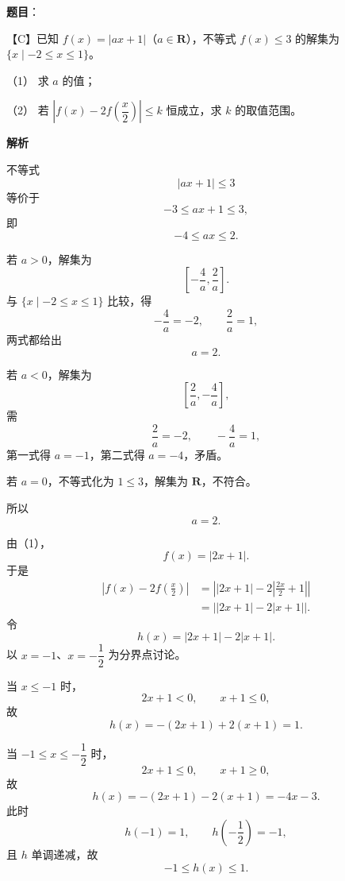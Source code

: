 \begin{answer}

\textbf{题目}：

【C】已知 $f(x)=|ax+1|$（$a\in\mathbf R$），不等式 $f(x)\leqslant 3$ 的解集为 $\{x\mid -2\leqslant x\leqslant 1\}$。

（1） 求 $a$ 的值；

（2） 若 $\left|f(x)-2f\left(\dfrac x2\right)\right|\leqslant k$ 恒成立，求 $k$ 的取值范围。

\textbf{解析}


不等式
\nopagebreak[4]
\[|ax+1|\leqslant3\]
等价于
\nopagebreak[4]
\[-3\leqslant ax+1\leqslant3,\]
即
\nopagebreak[4]
\[-4\leqslant ax\leqslant2.\]

若 $a>0$，解集为
\nopagebreak[4]
\[\left[-\frac4a,\frac2a\right].\]
与 $\{x\mid-2\leqslant x\leqslant1\}$ 比较，得
\nopagebreak[4]
\[-\frac4a=-2,\qquad \frac2a=1,\]
两式都给出
\nopagebreak[4]
\[a=2.\]

若 $a<0$，解集为
\nopagebreak[4]
\[\left[\frac2a,-\frac4a\right],\]
需
\nopagebreak[4]
\[\frac2a=-2,\qquad -\frac4a=1,\]
第一式得 $a=-1$，第二式得 $a=-4$，矛盾。

若 $a=0$，不等式化为 $1\leqslant3$，解集为 $\mathbf R$，不符合。

所以
\nopagebreak[4]
\[a=2.\]


由（1），
\nopagebreak[4]
\[f(x)=|2x+1|.\]
于是
\nopagebreak[4]
\[\begin{aligned}
\left|f(x)-2f\left(\frac x2\right)\right|
&=\left||2x+1|-2\left|\frac{2x}{2}+1\right|\right|\\
&=\left||2x+1|-2|x+1|\right|.
\end{aligned}\]
令
\nopagebreak[4]
\[h(x)=|2x+1|-2|x+1|.\]
以 $x=-1$、$x=-\dfrac12$ 为分界点讨论。

当 $x\leqslant-1$ 时，
\nopagebreak[4]
\[2x+1<0,\qquad x+1\leqslant0,\]
故
\nopagebreak[4]
\[h(x)=-(2x+1)+2(x+1)=1.\]

当 $-1\leqslant x\leqslant-\dfrac12$ 时，
\nopagebreak[4]
\[2x+1\leqslant0,\qquad x+1\geqslant0,\]
故
\nopagebreak[4]
\[h(x)=-(2x+1)-2(x+1)=-4x-3.\]
此时
\nopagebreak[4]
\[h(-1)=1,\qquad h\left(-\frac12\right)=-1,\]
且 $h$ 单调递减，故
\nopagebreak[4]
\[-1\leqslant h(x)\leqslant1.\]


\end{answer}
